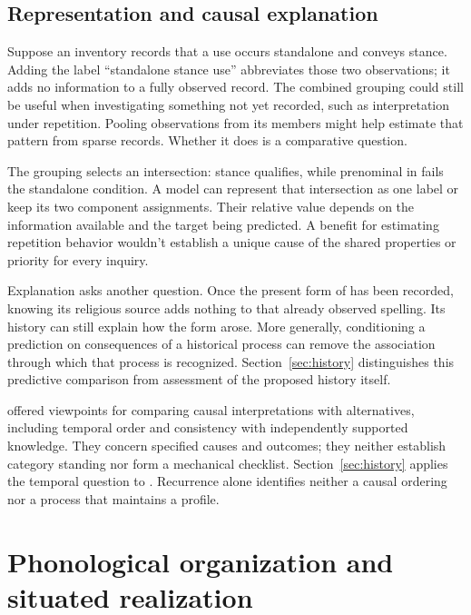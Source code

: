 \documentclass[12pt]{article}
\begin{document}
\subsection{Representation and causal explanation}

Suppose an inventory records that a use occurs standalone and conveys
stance. Adding the label \enquote{standalone stance use} abbreviates
those two observations; it adds no information to a fully observed
record. The combined grouping could still be useful when investigating
something not yet recorded, such as interpretation under repetition.
Pooling observations from its members might help estimate that pattern
from sparse records. Whether it does is a comparative question.

The grouping selects an intersection: stance  qualifies,
while prenominal  in  fails the
standalone condition. A model can represent that intersection as one
label or keep its two component assignments. Their relative value
depends on the information available and the target being predicted.
A benefit for estimating repetition behavior wouldn't establish a
unique cause of the shared properties or priority for every inquiry.

Explanation asks another question. Once the present form of 
has been recorded, knowing its religious source adds nothing to that
already observed spelling. Its history can still explain how the form
arose. More generally, conditioning a prediction on consequences of a
historical process can remove the association through which that process
is recognized. Section~\ref{sec:history} distinguishes this predictive
comparison from assessment of the proposed history itself.

\textcite[295--299]{hill1965} offered viewpoints for comparing causal
interpretations with alternatives, including temporal order and consistency
with independently supported knowledge. They concern specified causes
and outcomes; they neither establish category standing nor form a
mechanical checklist. Section~\ref{sec:history} applies the temporal
question to . Recurrence alone identifies neither a causal
ordering nor a process that maintains a profile.

\section{Phonological organization and situated realization}\label{sec:phonology}
\end{document}
